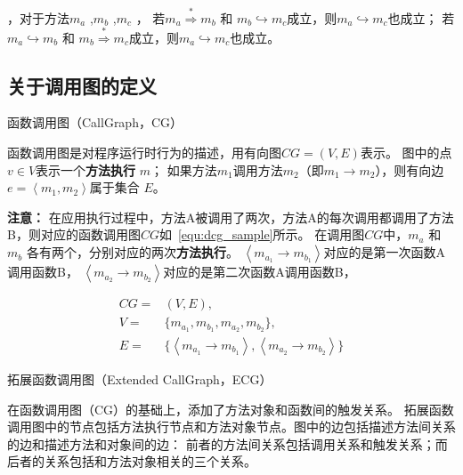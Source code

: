 ，对于方法$m_a$ ,$m_b$ ,$m_c$ ，
若$m_a  \stackrel{\ast}{ \Rightarrow } m_b$ 和 $m_b \hookrightarrow m_c$成立，则$m_a \hookrightarrow m_c$也成立；
若$m_a  \hookrightarrow m_b$ 和 $m_b \stackrel{\ast}{ \Rightarrow }  m_c$成立，则$m_a \hookrightarrow m_c$也成立。

\subsection{关于调用图的定义}

\begin{Def}
	函数调用图（CallGraph，CG）
\end{Def}	

	函数调用图是对程序运行时行为的描述，用有向图$CG = ( V , E)$表示。 图中的点$ v \in V $表示一个\textbf{方法执行} $m$；
	如果方法$m_1$调用方法$m_2$（即$m_1 \to m_2$），则有向边 $e = \left\langle m_1 ,m_2 \right\rangle $属于集合 $E$。 


\textbf{注意：}
在应用执行过程中，方法A被调用了两次，方法A的每次调用都调用了方法B，则对应的函数调用图$CG$如~\autoref{equ:dcg_sample}所示。
在调用图$CG$中，$m_a$ 和 $m_b$ 各有两个，分别对应的两次\textbf{方法执行}。
$\left\langle m_{a_{1}} \to m_{b_{1}}\right\rangle $对应的是第一次函数A调用函数B，
$\left\langle m_{a_{2}} \to m_{b_{2}} \right\rangle    $对应的是第二次函数A调用函数B，

\begin{equation}
\begin{aligned}
CG = &(V,E) ,\\ 
V = & \{m_{a_{1}},m_{b_{1}},m_{a_{2}},m_{b_{2}}\}, \\ 
E = & \{  
\left\langle  m_{a_{1}} \to m_{b_{1}} \right\rangle  ,\left\langle  m_{a_{2}} \to m_{b_{2}}\right\rangle 
\} 
\end{aligned}
\label{equ:dcg_sample} 
\end{equation}



\begin{Def}
	拓展函数调用图（Extended CallGraph，ECG）
\end{Def}


	在函数调用图（CG）的基础上，添加了方法对象和函数间的触发关系。
	拓展函数调用图中的节点包括方法执行节点和方法对象节点。图中的边包括描述方法间关系的边和描述方法和对象间的边：
	前者的方法间关系包括调用关系和触发关系；而后者的关系包括和方法对象相关的三个关系。
	
